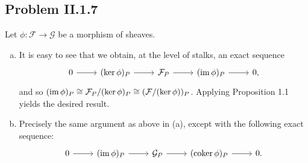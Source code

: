 \documentclass{mathnotes}
\begin{document}
\subsection*{Problem II.1.7}
Let $\phi:\mathcal{F}\to\mathcal{G}$ be a morphism of sheaves.
\begin{enumerate}[(a)]
    \item It is easy to see that we obtain, at the level of stalks, an exact sequence
        \begin{equation*}
            \begin{tikzcd}
                0\ar{r} & (\ker\phi)_P\ar{r} & \mathcal{F}_P\ar{r} & (\im\phi)_P\ar{r} & 0,
            \end{tikzcd}
        \end{equation*}
        and so $(\operatorname{im}\phi)_P\cong\mathcal{F}_P/(\ker\phi)_P\cong(\mathcal{F}/(\ker\phi))_P$. Applying Proposition 1.1 yields
        the desired result.
    \item Precisely the same argument as above in (a), except with the following exact sequence:
        \begin{equation*}
            \begin{tikzcd}
                0\ar{r} & (\im\phi)_P\ar{r} & \mathcal{G}_P\ar{r} & (\coker\phi)_P\ar{r} & 0.
            \end{tikzcd}
        \end{equation*}
\end{enumerate}
\end{document}
